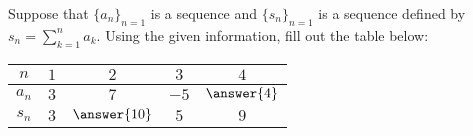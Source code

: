 \documentclass{ximera}
\author{Jim Talamo}
\begin{document}
\begin{exercise}

Suppose that $\{a_n\}_{n=1}$ is a sequence and $\{s_n\}_{n=1}$ is a sequence defined by $s_n = \sum_{k=1}^n a_k$. Using the given information, fill out the table below:  


\begin{tabular}{c||c|c|c|c}

$n$ \quad & \quad \quad $1$  \quad \quad & \quad \quad $2$ \quad \quad & \quad \quad $3$ \quad \quad & \quad \quad $4$ \quad \quad\\
\hline 
$a_n$ \quad & \quad \quad $3$  \quad \quad & \quad \quad $7$ \quad \quad  & \quad \quad $-5$ \quad \quad & \quad \quad  $\answer{4}$ \quad \quad\\
\hline
$s_n$ \quad & \quad \quad $3$ \quad \quad & \quad \quad $\answer{10}$ \quad \quad & \quad \quad  $5$ \quad \quad & \quad \quad $9$ \quad \quad\\
\end{tabular}

 
    \end{exercise}
\end{document}
